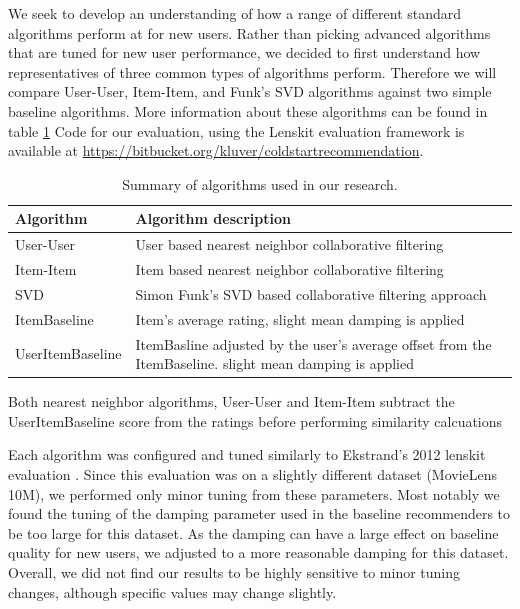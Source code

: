 \documentclass[letterpaper]{sig-alternate}
\begin{document}
  We seek to develop an understanding of how a range of different standard algorithms perform at for new users.
  Rather than picking advanced algorithms that are tuned for new user performance, we decided to first understand how representatives of three common types of algorithms perform.
  Therefore we will compare User-User, Item-Item, and Funk's SVD algorithms against two simple baseline algorithms.
  More information about these algorithms can be found in table \ref{tbl:algo}
  Code for our evaluation, using the Lenskit evaluation framework \cite{lenskit} is available at \url{https://bitbucket.org/kluver/coldstartrecommendation}.
  
  \begin{table}
    \centering
    \begin{tabular}{|p{6em}|p{18em}|}
      \hline
      Algorithm        & Algorithm description                                                                                     \\\hline
      User-User        & User based nearest neighbor collaborative filtering \cite{resnick1994grouplens}                           \\\hline
      Item-Item        & Item based nearest neighbor collaborative filtering \cite{sarwar2001item}                                 \\\hline
      SVD              & Simon Funk's SVD based collaborative filtering approach \cite{funk_netflix_2006}                          \\\hline
      ItemBaseline     & Item's average rating, slight mean damping is applied                                                     \\\hline
      UserItem\-Baseline & ItemBasline adjusted by the user's average offset from the ItemBaseline. slight mean damping is applied \\\hline
    \end{tabular}
    \caption{Summary of algorithms used in our research.}
    \label{tbl:algo}
  \end{table}


  Both nearest neighbor algorithms, User-User and Item-Item subtract the UserItemBaseline score from the ratings before performing similarity calcuations

  Each algorithm was configured and tuned similarly to Ekstrand's 2012 lenskit evaluation \cite{ekstrand2012recommenders}.
  Since this evaluation was on a slightly different dataset (MovieLens 10M), we performed only minor tuning from these parameters.
  Most notably we found the tuning of the damping parameter used in the baseline recommenders to be too large for this dataset.
  As the damping can have a large effect on baseline quality for new users, we adjusted to a more reasonable damping for this dataset.
  Overall, we did not find our results to be highly sensitive to minor tuning changes, although specific values may change slightly.
\end{document}
